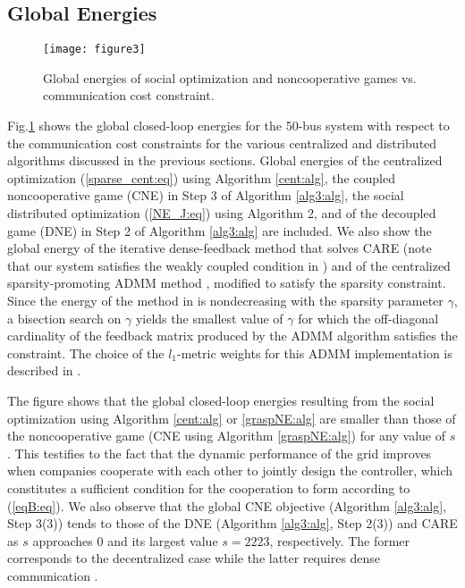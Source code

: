 \documentclass[12pt, draftclsnofoot,onecolumn]{IEEEtran}
\newcommand{\curvewidth}{3.3in}
\newcommand{\curvewidth}{3.5in}
\begin{document}
\subsection{Global Energies}
\label{alg_pfm:sec}


\begin{figure}[!t]
\centering 
\texttt{[image: figure3]}
\caption{Global energies of social optimization and noncooperative games vs. communication cost constraint.}
\label{J:fig}
\end{figure}

Fig.\ref{J:fig} shows the global closed-loop energies for the 50-bus system with respect to the communication cost constraints for the various centralized and distributed algorithms discussed in the previous sections. Global energies of the centralized optimization (\ref{sparse_cent:eq}) using Algorithm \ref{cent:alg}, the coupled noncooperative game (CNE) in Step 3 of Algorithm \ref{alg3:alg}, the social distributed optimization (\ref{NE_J:eq}) using Algorithm 2, and of the decoupled game (DNE) in Step 2 of Algorithm \ref{alg3:alg} are included. We also show the global energy of the iterative dense-feedback method that solves CARE \cite{Mukaidani2006} (note that our system satisfies the weakly coupled condition in \cite{Mukaidani2006}) and of the centralized sparsity-promoting ADMM method \cite{dorjovchebulTPS14}, modified to satisfy the sparsity constraint. Since the energy of the method in \cite{dorjovchebulTPS14} is nondecreasing with the sparsity parameter $\gamma$, a bisection search on $\gamma$ yields the smallest value of $\gamma$ for which the off-diagonal cardinality of the feedback matrix produced by the ADMM algorithm satisfies the constraint. The choice of the $l_1$-metric weights for this ADMM implementation is described in \cite{lianensuring}.

The figure shows that the global closed-loop energies resulting from the social optimization using Algorithm {\ref{cent:alg}} or {\ref{graspNE:alg}} are smaller than those of the noncooperative game (CNE using Algorithm \ref{graspNE:alg}) for any value of $s$. This testifies to the fact that the dynamic performance of the grid improves when companies cooperate with each other to jointly design the controller, which constitutes a sufficient condition for the cooperation to form according to ({\ref{eqB:eq}}). We also observe that the global CNE objective (Algorithm \ref{alg3:alg}, Step 3(3)) tends to those of the DNE (Algorithm \ref{alg3:alg}, Step 2(3)) and CARE as $s$ approaches 0 and its largest value $s=2223$, respectively. The former corresponds to the decentralized case \cite{lianensuring} while the latter requires dense communication \cite{Mukaidani2006}.   
\end{document}
